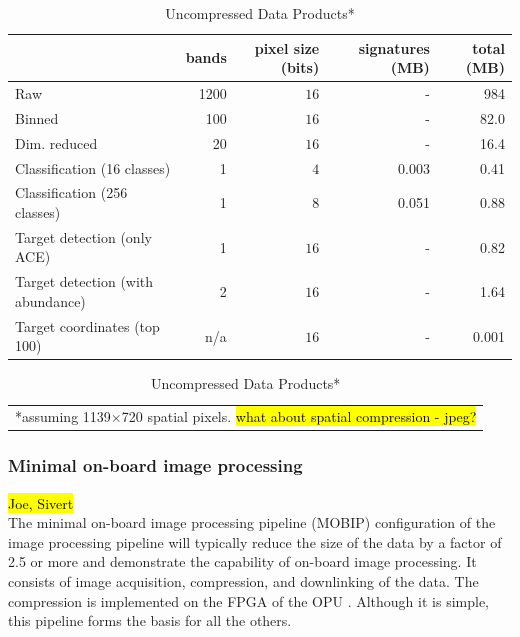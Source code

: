 \begin{table}[htbp]
	\caption{Uncompressed Data Products*}
	\label{tab:data-products}
	\centering
	\begin{tabular}{l | r r r r}
	\hline
	& bands & pixel size (bits) & signatures (MB) & total (MB) \\
	\hline
	Raw & 1200 & $16$& - &984\hspace{10 pt} \hspace{1 pt} \\
	Binned & 100 & $16$ & - & 82.0\hspace{4 pt} \hspace{1 pt} \\
	Dim. reduced & 20 & $16$ & - & 16.4\hspace{4 pt} \hspace{1 pt} \\
	Classification (16 classes) & 1 & $4$ & 0.003 & 0.41 \hspace{1 pt} \\
	Classification (256 classes) & 1 & $8$ & 0.051 & 0.88 \hspace{1 pt} \\
	Target detection (only ACE) & 1 & $16$ & - & 0.82 \hspace{1 pt} \\
	Target detection (with abundance) & 2 & $16$ & - & 1.64 \hspace{1 pt} \\
	Target coordinates (top 100) & n/a & $16$ & - & 0.001 \\
	\hline
	\end{tabular}
	
	\begin{tabular}{c}
		*assuming 1139$\times$720 spatial pixels. \hl{what about spatial compression - jpeg?}
	\end{tabular}
	\vspace*{-\baselineskip}

\end{table}

\subsubsection{Minimal on-board image processing}
\hl{Joe, Sivert \\}
The minimal on-board image processing pipeline (MOBIP) configuration of the image processing pipeline will typically reduce the size of the data by a factor of 2.5 or more and demonstrate the capability of on-board image processing. 
It consists of image acquisition, compression, and downlinking of the data. 
The compression is implemented on the FPGA of the OPU \cite{Fjeldtvedt2018, orlandic_parallel_2019}. 
Although it is simple, this pipeline forms the basis for all the others. 

